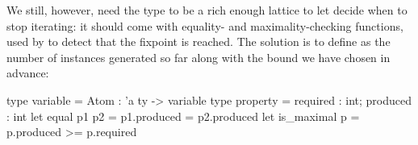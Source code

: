 We still, however, need the  type to be a rich enough lattice to
let  decide when to stop iterating: it should come with equality- and
maximality-checking functions, used by  to detect that the fixpoint is
reached. The solution is to define  as the number of instances
generated so far along with the bound we have chosen in advance:
%
\begin{ocamlcode}
  type variable = Atom : 'a ty -> variable
  type property = { required : int; produced : int }
  let equal p1 p2 = p1.produced = p2.produced
  let is_maximal p = p.produced >= p.required
\end{ocamlcode}
%
